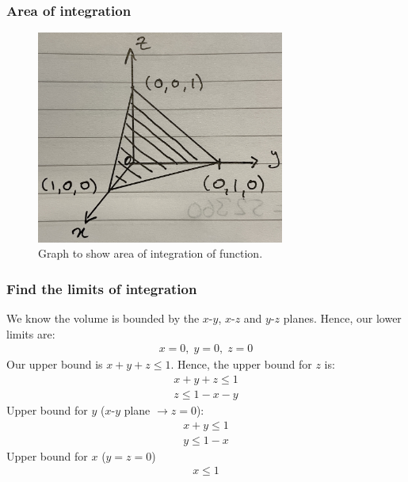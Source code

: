 \documentclass[11pt]{article}
\numberwithin{equation}{section}
\begin{document}
\subsubsection{Area of integration}
\begin{figure}[H]
    \centering
    \includegraphics[height = 7cm]{./img/q203a.jpg}
    \caption{Graph to show area of integration of function.}
\end{figure}
\subsubsection{Find the limits of integration}
We know the volume is bounded by the $x$-$y$, $x$-$z$ and $y$-$z$ planes. Hence, our lower limits are:
\begin{align}
    x = 0, \; y = 0, \; z = 0
\end{align}
Our upper bound is $x+y+z \leq 1$. Hence, the upper bound for $z$ is:
\begin{gather}
    x + y + z \leq 1\\
    z \leq 1 - x - y
\end{gather}
Upper bound for $y$ ($x$-$y$ plane $\rightarrow z = 0$):
\begin{gather}
    x + y \leq 1\\
    y \leq 1 - x
\end{gather}
Upper bound for $x$ ($y=z=0$)
\begin{gather}
    x \leq 1
\end{gather}
\end{document}
